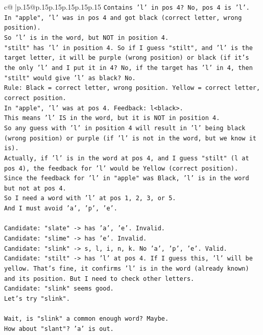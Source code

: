 \documentclass{article}
\begin{document}
{\begin{supertabular}{c@{$\;$}|p{.15\linewidth}@{}p{.15\linewidth}p{.15\linewidth}p{.15\linewidth}p{.15\linewidth}p{.15\linewidth}}
{{{\texttt{Contains 'l' in pos 4? No, pos 4 is 'l'.} \\
\texttt{In "apple", 'l' was in pos 4 and got black (correct letter, wrong position).} \\
\texttt{So 'l' is in the word, but NOT in position 4.} \\
\texttt{"stilt" has 'l' in position 4. So if I guess "stilt", and 'l' is the target letter, it will be purple (wrong position) or black (if it's the only 'l' and I put it in 4? No, if the target has 'l' in 4, then "stilt" would give 'l' as black? No.} \\
\texttt{Rule: Black = correct letter, wrong position. Yellow = correct letter, correct position.} \\
\texttt{In "apple", 'l' was at pos 4. Feedback: l<black>.} \\
\texttt{This means 'l' IS in the word, but it is NOT in position 4.} \\
\texttt{So any guess with 'l' in position 4 will result in 'l' being black (wrong position) or purple (if 'l' is not in the word, but we know it is).} \\
\texttt{Actually, if 'l' is in the word at pos 4, and I guess "stilt" (l at pos 4), the feedback for 'l' would be Yellow (correct position).} \\
\texttt{Since the feedback for 'l' in "apple" was Black, 'l' is in the word but not at pos 4.} \\
\texttt{So I need a word with 'l' at pos 1, 2, 3, or 5.} \\
\texttt{And I must avoid 'a', 'p', 'e'.} \\
\\ 
\texttt{Candidate: "slate" {-}> has 'a', 'e'. Invalid.} \\
\texttt{Candidate: "slime" {-}> has 'e'. Invalid.} \\
\texttt{Candidate: "slink" {-}> s, l, i, n, k. No 'a', 'p', 'e'. Valid.} \\
\texttt{Candidate: "stilt" {-}> has 'l' at pos 4. If I guess this, 'l' will be yellow. That's fine, it confirms 'l' is in the word (already known) and its position. But I need to check other letters.} \\
\texttt{Candidate: "slink" seems good.} \\
\texttt{Let's try "slink".} \\
\\ 
\texttt{Wait, is "slink" a common enough word? Maybe.} \\
\texttt{How about "slant"? 'a' is out.} \\
}}}
\end{supertabular}}
\end{document}
